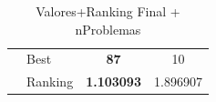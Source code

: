 \begin{table}[]
\begin{tabular}{ll|r|r|}
\multicolumn{1}{l|}{}                                                    & \cellcolor[HTML]{FFFFC7}Best    & \multicolumn{1}{c|}{\cellcolor[HTML]{D3FFB6}\textbf{87}}       & \multicolumn{1}{c|}{10}                                   \\
\multicolumn{1}{l|}{}                                                    & \cellcolor[HTML]{FFFFC7}Ranking & \multicolumn{1}{c|}{\cellcolor[HTML]{D3FFB6}\textbf{1.103093}} & \multicolumn{1}{c|}{1.896907}                             \\ \cline{2-4} 
\end{tabular}
\caption{Valores+Ranking Final + nProblemas}
\end{table}

\newpage
{}

